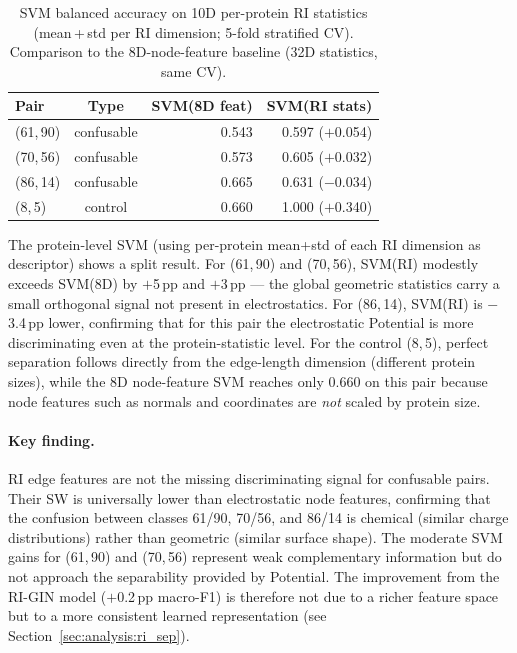\begin{table}[ht]
  \centering
  \caption{SVM balanced accuracy on 10D per-protein RI statistics
           (mean\,+\,std per RI dimension; 5-fold stratified CV).
           Comparison to the 8D-node-feature baseline (32D statistics, same CV).}
  \label{tab:svm_ri}
  \begin{tabular}{lcrr}
    \toprule
    \textbf{Pair} & \textbf{Type} & \textbf{SVM(8D feat)} & \textbf{SVM(RI stats)} \\
    \midrule
    (61,\,90) & confusable & 0.543 & 0.597 \;($+$0.054) \\
    (70,\,56) & confusable & 0.573 & 0.605 \;($+$0.032) \\
    (86,\,14) & confusable & 0.665 & 0.631 \;($-$0.034) \\
    (8,\,5)   & control    & 0.660 & 1.000 \;($+$0.340) \\
    \bottomrule
  \end{tabular}
\end{table}

The protein-level SVM (using per-protein mean+std of each RI dimension as
descriptor) shows a split result.
For (61,\,90) and (70,\,56), SVM(RI) modestly exceeds SVM(8D) by $+$5\,pp and
$+$3\,pp --- the global geometric statistics carry a small orthogonal signal not
present in electrostatics.
For (86,\,14), SVM(RI) is $-$3.4\,pp lower, confirming that for this pair the
electrostatic Potential is more discriminating even at the protein-statistic level.
For the control (8,\,5), perfect separation follows directly from the edge-length
dimension (different protein sizes), while the 8D node-feature SVM reaches only
0.660 on this pair because node features such as normals and coordinates are
\textit{not} scaled by protein size.

\paragraph{Key finding.}
RI edge features are not the missing discriminating signal for confusable pairs.
Their SW is universally lower than electrostatic node features, confirming
that the confusion between classes 61/90, 70/56, and 86/14 is chemical
(similar charge distributions) rather than geometric (similar surface shape).
The moderate SVM gains for (61,\,90) and (70,\,56) represent weak complementary
information but do not approach the separability provided by Potential.
The improvement from the RI-GIN model ($+$0.2\,pp macro-F1) is therefore not
due to a richer feature space but to a more consistent learned representation
(see Section~\ref{sec:analysis:ri_sep}).


